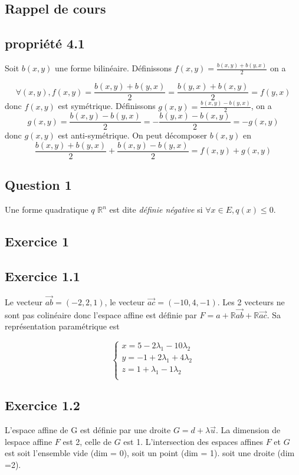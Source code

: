 \documentclass[]{book}
\theoremstyle{definition}
\newcommand{\bb}[1]{\mathbb{#1}}
\newcommand{\R}{\bb{R}}
\newcommand{\vect}[1]{\overrightarrow{#1}}
\begin{document}
\subsection*{Rappel de cours}

\subsection*{propri\'et\'e 4.1}
Soit $b(x,y)$ une forme bilin\'eaire. D\'efinissons $f(x,y) = \frac{b(x,y)+b(y,x)}{2}$ on a 

$$\forall (x,y), f(x, y) = \frac{b(x,y)+b(y,x)}{2} = \frac{b(y,x)+b(x,y)}{2} = f(y,x)$$
donc $f(x,y)$ est sym\'etrique. D\'efinissons $g(x,y) = \frac{b(x,y) - b(y,x)}{2}$, on a 
$$g(x,y) =  \frac{b(x,y) - b(y,x)}{2} = -\frac{b(y,x) - b(x,y)}{2} = -g(x,y)$$
donc $g(x,y)$ est anti-sym\'etrique. On peut d\'ecomposer $b(x,y)$ en 
$$\frac{b(x,y) + b(y,x)}{2} + \frac{b(x,y) - b(y,x)}{2} = f(x,y) + g(x,y)$$



\newpage
\subsection*{Question 1}
Une forme quadratique $q$ $\R^n$ est dite \emph{d\'efinie n\'egative} si $\forall x \in E, q(x) \leq 0$. 


\subsection*{Exercice 1}
\subsection*{Exercice 1.1}
Le vecteur $\vect{ab} = (-2,2,1)$, le vecteur $\vect{ac} = (-10, 4, -1)$. Les 2 vecteurs ne sont pas colin\'eaire donc l'espace affine est d\'efinie par $F= a + \R \vect{ab} + \R \vect{ac}$. Sa repr\'esentation param\'etrique est

$$
\left\{
\begin{array}{l}
x = 5 -2\lambda_1 - 10\lambda_2\\
y = -1 +2\lambda_1 + 4\lambda_2\\
z = 1 +\lambda_1 - 1\lambda_2\\
\end{array}
\right.
$$

\subsection*{Exercice 1.2}
L'espace affine de G est d\'efinie par une droite $G = d + \lambda \vect{u}$. La dimension de lespace affine $F$ est 2, celle de $G$ est 1. L'intersection des espaces affines $F$ et $G$ est soit l'ensemble vide (dim = 0), soit un point (dim = 1). soit une droite (dim =2). 
\end{document}
